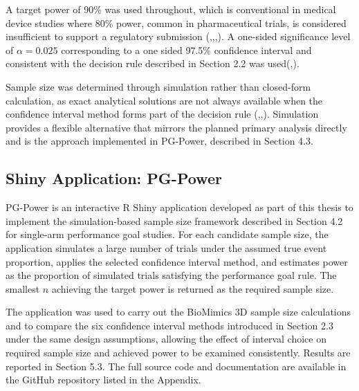 \documentclass{article}
\begin{document}
A target power of 90\% was used throughout, which is conventional in
medical device studies where 80\% power, common in pharmaceutical
trials, is considered insufficient to support a regulatory submission
(,,,).
A one-sided significance level of \(\alpha = 0.025\) corresponding to a
one sided 97.5\% confidence interval and consistent with the decision
rule described in Section 2.2 was
used(,).

Sample size was determined through simulation rather than closed-form
calculation, as exact analytical solutions are not always available when
the confidence interval method forms part of the decision rule
(,,).
Simulation provides a flexible alternative that mirrors the planned
primary analysis directly and is the approach implemented in PG-Power,
described in Section 4.3.

\subsection{Shiny Application:
PG-Power}\label{shiny-application-pg-power}

PG-Power is an interactive R Shiny application developed as part of this
thesis to implement the simulation-based sample size framework described
in Section 4.2 for single-arm performance goal studies. For each
candidate sample size, the application simulates a large number of
trials under the assumed true event proportion, applies the selected
confidence interval method, and estimates power as the proportion of
simulated trials satisfying the performance goal rule. The smallest
\(n\) achieving the target power is returned as the required sample
size.

The application was used to carry out the BioMimics 3D sample size
calculations and to compare the six confidence interval methods
introduced in Section 2.3 under the same design assumptions, allowing
the effect of interval choice on required sample size and achieved power
to be examined consistently. Results are reported in Section 5.3. The
full source code and documentation are available in the GitHub
repository listed in the Appendix.
\end{document}
